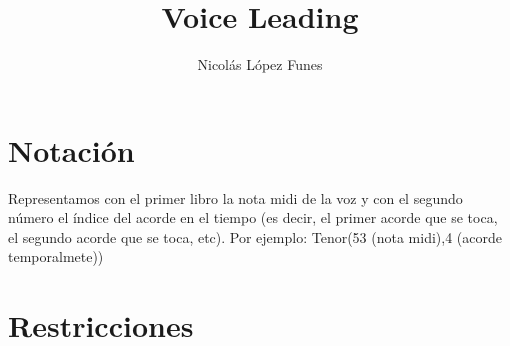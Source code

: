 \documentclass{article}
\title{Voice Leading}
\author{Nicolás López Funes}
\begin{document}
	\maketitle
		
	\section{Notación}
	
	Representamos con el primer libro la nota midi de la voz y con el segundo número el índice del acorde en el tiempo (es decir, el primer acorde que se toca, el segundo acorde que se toca, etc). Por ejemplo: Tenor(53 (nota midi),4 (acorde temporalmete))\\
	
	\section{Restricciones}
	
\end{document}
